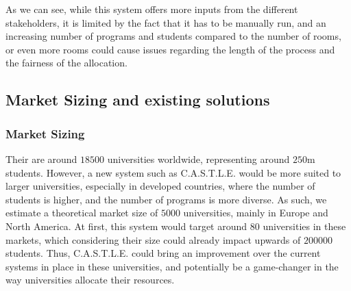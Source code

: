 \documentclass[a4paper, oneside]{article}
\theoremstyle{plain}
\newcommand{\castle}{C{\small.}A{\small.}S{\small.}T{\small.}L{\small.}E{\small.}}
\begin{document}
\linebreak

As we can see, while this system offers more inputs from the different stakeholders, it is limited by the fact that it has to be
manually run, and an increasing number of programs and students compared to the number of rooms, or even more rooms could cause issues
regarding the length of the process and the fairness of the allocation.

\subsection{Market Sizing and existing solutions}
\subsubsection{Market Sizing}
Their are around $18500$ universities worldwide, representing around $250$m students. However, a new system such as \castle{} would be more suited to larger universities, especially in developed countries, where the number of students is higher, and the number of programs is more diverse.
As such, we estimate a theoretical market size of $5000$ universities, mainly in Europe and North America.
At first, this system would target around 80 universities in these markets, which considering their size could already impact upwards of $200000$ students.
Thus, \castle{} could bring an improvement over the current systems in place in these universities, and potentially be a game-changer in the way universities allocate their resources.
\end{document}
